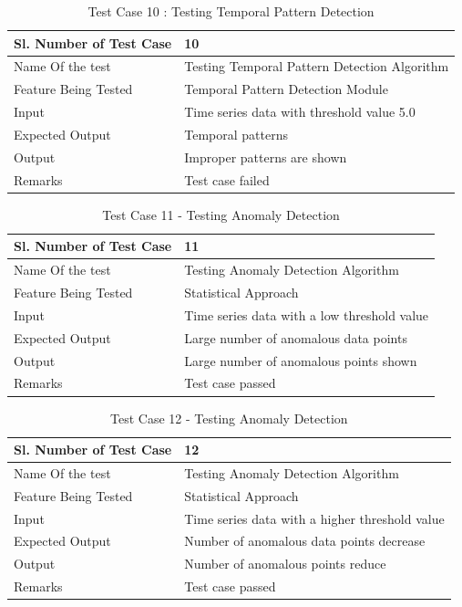 \documentclass[12pt,a4paper]{report}
\begin{document}
\begin{table}
    \begin{tabular}{|l|l|}
    \hline
    Sl. Number of Test Case & 10                            \\ \hline
    Name Of the test        & Testing Temporal Pattern Detection Algorithm \\ \hline
    Feature Being Tested    & Temporal Pattern Detection Module \\ \hline
    Input                   & Time series data with threshold value 5.0\\ \hline
    Expected Output         & Temporal patterns \\ \hline
    Output                  & Improper patterns are shown \\ \hline
    Remarks                 & Test case failed             \\ \hline
    \end{tabular}
    \caption {Test Case 10 : Testing Temporal Pattern Detection}
\end{table}
\begin{table}
    \begin{tabular}{|l|l|}
    \hline
    Sl. Number of Test Case & 11                            \\ \hline
    Name Of the test        & Testing Anomaly Detection Algorithm\\ \hline
    Feature Being Tested    & Statistical Approach  \\ \hline
    Input                   & Time series data with a low threshold value\\ \hline
    Expected Output         & Large number of anomalous data points \\ \hline
    Output                  & Large number of anomalous points shown \\ \hline
    Remarks                 & Test case passed             \\ \hline
    \end{tabular}
    \caption {Test Case 11 - Testing Anomaly Detection}
\end{table}
\begin{table}
    \begin{tabular}{|l|l|}
    \hline
    Sl. Number of Test Case & 12                            \\ \hline
    Name Of the test        & Testing Anomaly Detection Algorithm\\ \hline
    Feature Being Tested    & Statistical Approach  \\ \hline
    Input                   & Time series data with a higher threshold value\\ \hline
    Expected Output         & Number of anomalous data points decrease \\ \hline
    Output                  & Number of anomalous points reduce \\ \hline
    Remarks                 & Test case passed             \\ \hline
    \end{tabular}
    \caption {Test Case 12 - Testing Anomaly Detection}
\end{table}
\end{document}
